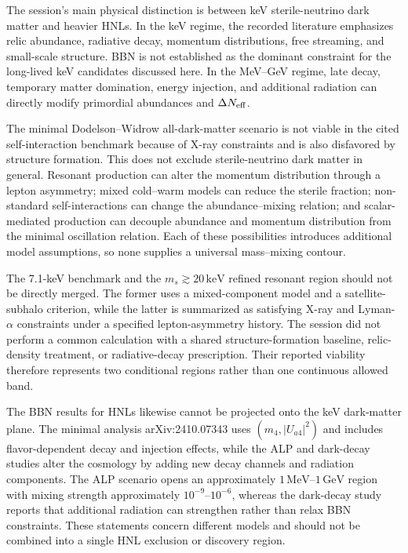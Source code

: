\documentclass[11pt,a4paper]{article}
\begin{document}
The session's main physical distinction is between keV sterile-neutrino dark matter and heavier HNLs. In the keV regime, the recorded literature emphasizes relic abundance, radiative decay, momentum distributions, free streaming, and small-scale structure. BBN is not established as the dominant constraint for the long-lived keV candidates discussed here. In the MeV--GeV regime, late decay, temporary matter domination, energy injection, and additional radiation can directly modify primordial abundances and \(\Delta N_{\rm eff}\).

The minimal Dodelson--Widrow all-dark-matter scenario is not viable in the cited self-interaction benchmark because of X-ray constraints and is also disfavored by structure formation. This does not exclude sterile-neutrino dark matter in general. Resonant production can alter the momentum distribution through a lepton asymmetry; mixed cold--warm models can reduce the sterile fraction; non-standard self-interactions can change the abundance--mixing relation; and scalar-mediated production can decouple abundance and momentum distribution from the minimal oscillation relation. Each of these possibilities introduces additional model assumptions, so none supplies a universal mass--mixing contour.

The 7.1-keV benchmark and the \(m_s\gtrsim20\,\mathrm{keV}\) refined resonant region should not be directly merged. The former uses a mixed-component model and a satellite-subhalo criterion, while the latter is summarized as satisfying X-ray and Lyman-\(\alpha\) constraints under a specified lepton-asymmetry history. The session did not perform a common calculation with a shared structure-formation baseline, relic-density treatment, or radiative-decay prescription. Their reported viability therefore represents two conditional regions rather than one continuous allowed band.

The BBN results for HNLs likewise cannot be projected onto the keV dark-matter plane. The minimal analysis arXiv:2410.07343 uses \((m_4,\lvert U_{a4}\rvert^2)\) and includes flavor-dependent decay and injection effects, while the ALP and dark-decay studies alter the cosmology by adding new decay channels and radiation components. The ALP scenario opens an approximately \(1\,\mathrm{MeV}\)--\(1\,\mathrm{GeV}\) region with mixing strength approximately \(10^{-9}\)--\(10^{-6}\), whereas the dark-decay study reports that additional radiation can strengthen rather than relax BBN constraints. These statements concern different models and should not be combined into a single HNL exclusion or discovery region.
\end{document}
